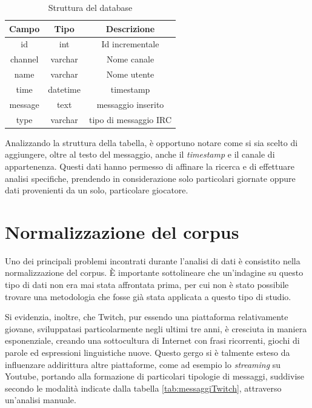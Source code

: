 \documentclass[a4paper,12pt,openright,twoside]{report}
\theoremstyle{definition}
\begin{document}
\begin{table}[h]
	\centering
	\begin{tabular}{|c|c|c|}
		\hline
		\textbf{Campo} &\textbf{ Tipo} & \textbf{Descrizione} \\
		\hline
		\hline
		id & int & Id incrementale \\
		\hline
		channel & varchar & Nome canale \\
		\hline
		name & varchar & Nome utente \\
		\hline
		time & datetime & timestamp \\
		\hline
		message & text & messaggio inserito \\
		\hline
		type & varchar & tipo di messaggio IRC \\
		\hline
	\end{tabular}
	\caption{Struttura del database}
	\label{tab:strutturaDB}
\end{table}

Analizzando la struttura della tabella, è opportuno notare come si sia scelto di aggiungere, 
oltre al testo del messaggio, anche 
il \emph{timestamp} e il canale di appartenenza. Questi dati hanno permesso di 
affinare la ricerca e di effettuare analisi
specifiche, prendendo in considerazione
solo particolari giornate oppure dati provenienti da un solo, particolare giocatore.

\section{Normalizzazione del corpus}
Uno dei principali problemi incontrati durante l’analisi di dati è consistito 
nella normalizzazione del corpus.  \`E importante sottolineare che 
un'indagine su questo tipo di dati non era mai 
stata affrontata prima, per cui non è stato possibile trovare una metodologia
che fosse già stata applicata a questo tipo di studio.

Si evidenzia, inoltre, che Twitch, pur essendo una piattaforma relativamente giovane, 
sviluppatasi particolarmente negli ultimi tre anni, 
è cresciuta in maniera esponenziale, creando una sottocultura di Internet con frasi 
ricorrenti, giochi di parole ed espressioni linguistiche nuove. 
Questo gergo si è talmente esteso da influenzare addirittura altre piattaforme, 
come ad esempio lo \emph{streaming} su Youtube, portando 
alla formazione di particolari tipologie di messaggi, 
suddivise secondo le modalità indicate dalla tabella \ref{tab:messaggiTwitch},  attraverso un'analisi manuale.
\end{document}
